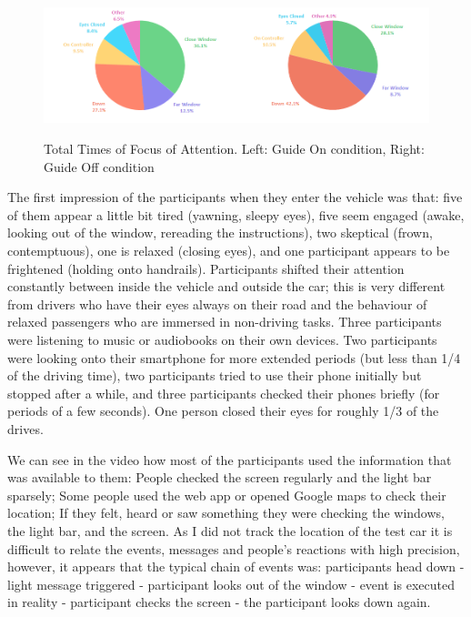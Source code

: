 \begin{figure}
    \includegraphics[width=0.5\textwidth]{fig/PieTotal.png}\includegraphics[width=0.5\textwidth]{fig/PieTotalNo.png}
    \caption[Total Times of Focus of Attention]{Total Times of Focus of Attention. Left: Guide On condition, Right: Guide Off condition}
    \label{fig:totalPie}
\end{figure}

The first impression of the participants when they enter the vehicle was that: five of them appear a little bit tired (yawning, sleepy eyes), five seem engaged (awake, looking out of the window, rereading the instructions), two skeptical (frown, contemptuous), one is relaxed (closing eyes), and one participant appears to be frightened (holding onto handrails). Participants shifted their attention constantly between inside the vehicle and outside the car; this is very different from drivers who have their eyes always on their road and the behaviour of relaxed passengers who are immersed in non-driving tasks. 
Three participants were listening to music or audiobooks on their own devices. Two participants were looking onto their smartphone for more extended periods (but less than 1/4 of the driving time), two participants tried to use their phone initially but stopped after a while, and three participants checked their phones briefly (for periods of a few seconds). One person closed their eyes for roughly 1/3 of the drives. 

We can see in the video how most of the participants used the information that was available to them: People checked the screen regularly and the light bar sparsely; Some people used the web app or opened Google maps to check their location; If they felt, heard or saw something they were checking the windows, the light bar, and the screen. As I did not track the location of the test car it is difficult to relate the events, messages and people's reactions with high precision, however, it appears that the typical chain of events was: participants head down - light message triggered - participant looks out of the window - event is executed in reality - participant checks the screen - the participant looks down again. 

